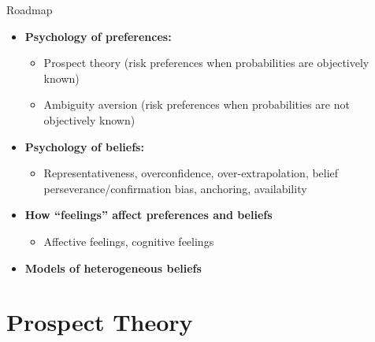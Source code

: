 \documentclass[aspectratio=169, 11pt]{beamer}
\begin{document}
\begin{frame}{Roadmap}
\begin{itemize}
\item \textbf{Psychology of preferences:}
  \begin{itemize}
  \item Prospect theory (risk preferences when probabilities are objectively known)
  \item Ambiguity aversion (risk preferences when probabilities are not objectively known)
  \end{itemize}
\item \textbf{Psychology of beliefs:}
  \begin{itemize}
  \item Representativeness, overconfidence, over-extrapolation, belief perseverance/confirmation bias, anchoring, availability
  \end{itemize}
\item \textbf{How ``feelings'' affect preferences and beliefs}
  \begin{itemize}
  \item Affective feelings, cognitive feelings
  \end{itemize}
\item \textbf{Models of heterogeneous beliefs}
\end{itemize}
\end{frame}

\section{Prospect Theory}
\end{document}
